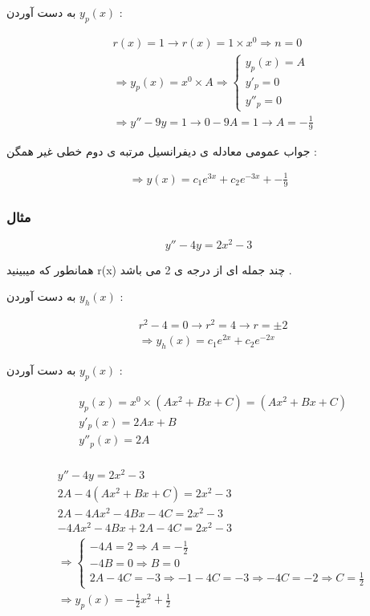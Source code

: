 \documentclass[12pt]{book}
\begin{document}
به دست آوردن 
$y_{p}(x)$ :

\begin{align*}
&r(x) = 1 \to r(x) = 1 \times x^{0} \Rightarrow n = 0 \\
&\Rightarrow y_{p}(x) = x^{0} \times A \Rightarrow
\begin{cases}
y_{p}(x) = A \\
y'_{p} = 0 \\
y''_{p} = 0
\end{cases} \\
&\Rightarrow
y'' - 9y = 1 \to 0 - 9A = 1 \to A = - \frac{1}{9}
\end{align*}

جواب عمومی معادله ی دیفرانسیل مرتبه ی دوم خطی غیر همگن :

\begin{align*}
\Rightarrow y(x) = c_{1}e^{3x} + c_{2} e^{-3x} + - \frac{1}{9}
\end{align*}




\subsubsection{مثال}

$$
y'' - 4y = 2x^{2} - 3
$$

همانطور که میبینید r(x) چند جمله ای از درجه ی 2 می باشد .


به دست آوردن 
$y_{h}(x)$ :

\begin{align*}
&r^{2} - 4 = 0 \to r^{2} = 4 \to r = \pm 2 \\
&\Rightarrow y_{h}(x) = c_{1}e^{2x} + c_{2}e^{-2x}
\end{align*}

به دست آوردن 
$y_{p}(x)$ :

\begin{align*}
&y_{p}(x) = x^{0} \times ( Ax^{2} + Bx + C ) = ( Ax^{2} + Bx + C ) \\
&y'_{p}(x) = 2Ax + B \\
&y''_{p}(x) = 2A \\
\end{align*}


\begin{align*}
&y'' - 4y = 2x^{2} - 3 \\
&2A - 4 ( Ax^{2} + Bx + C ) = 2x^{2} - 3 \\
&2A - 4Ax^{2} - 4Bx - 4C = 2x^{2} - 3 \\
&-4Ax^{2} - 4Bx + 2A - 4C = 2x^{2} - 3 \\
&\Rightarrow 
\begin{cases}
-4A = 2 \Rightarrow A = - \frac{1}{2} \\
-4B = 0 \Rightarrow B = 0 \\
2A - 4C = -3 \Rightarrow -1 - 4C = -3 \Rightarrow -4C = -2 \Rightarrow C = \frac{1}{2}
\end{cases} \\
&\Rightarrow y_{p}(x) = -\frac{1}{2} x^{2} + \frac{1}{2}
\end{align*}
\end{document}
